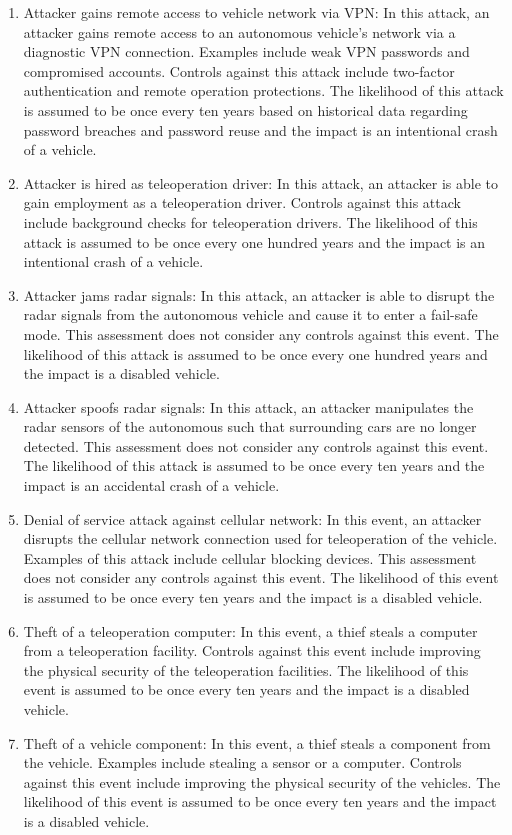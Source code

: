 \documentclass{article}
\begin{document}
\begin{enumerate}
\item Attacker gains remote access to vehicle network via VPN: In this attack, an attacker gains remote access to an autonomous vehicle's network via a diagnostic VPN connection. Examples include weak VPN passwords and compromised accounts. Controls against this attack include two-factor authentication and remote operation protections. The likelihood of this attack is assumed to be once every ten years based on historical data regarding password breaches and password reuse and the impact is an intentional crash of a vehicle.
\item Attacker is hired as teleoperation driver: In this attack, an attacker is able to gain employment as a teleoperation driver. Controls against  this attack include background checks for teleoperation drivers. The likelihood of this attack is assumed to be once every one hundred years and the impact is an intentional crash of a vehicle.
\item Attacker jams radar signals: In this attack, an attacker is able to disrupt the radar signals from the autonomous vehicle and cause it to enter a fail-safe mode. This assessment does not consider any controls against this event. The likelihood of this attack is assumed to be once every one hundred years and the impact is a disabled vehicle.
\item Attacker spoofs radar signals: In this attack, an attacker manipulates the radar sensors of the autonomous such that surrounding cars are no longer detected. This assessment does not consider any controls against this event. The likelihood of this attack is assumed to be once every ten years and the impact is an accidental crash of a vehicle.
\item Denial of service attack against cellular network: In this event, an attacker disrupts the cellular network connection used for teleoperation of the vehicle. Examples of this attack include cellular blocking devices. This assessment does not consider any controls against this event. The likelihood of this event is assumed to be once every ten years and the impact is a disabled vehicle.
\item Theft of a teleoperation computer: In this event, a thief steals a computer from a teleoperation facility. Controls against this event include improving the physical security of the teleoperation facilities. The likelihood of this event is assumed to be once every ten years and the impact is a disabled vehicle.
\item Theft of a vehicle component: In this event, a thief steals a component from the vehicle. Examples include stealing a sensor or a computer. Controls against this event include improving the physical security of the vehicles. The likelihood of this event is assumed to be once every ten years and the impact is a disabled vehicle.

\end{enumerate}
\end{document}
